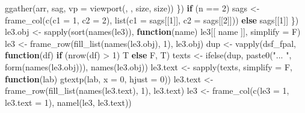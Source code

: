 \documentclass[
]{article}
\newenvironment{Shaded}{\begin{snugshade}}{\end{snugshade}}
\newcommand{\AttributeTok}[1]{\textcolor[rgb]{0.77,0.63,0.00}{#1}}
\newcommand{\ControlFlowTok}[1]{\textcolor[rgb]{0.13,0.29,0.53}{\textbf{#1}}}
\newcommand{\DecValTok}[1]{\textcolor[rgb]{0.00,0.00,0.81}{#1}}
\newcommand{\FunctionTok}[1]{\textcolor[rgb]{0.00,0.00,0.00}{#1}}
\newcommand{\NormalTok}[1]{#1}
\newcommand{\OtherTok}[1]{\textcolor[rgb]{0.56,0.35,0.01}{#1}}
\newcommand{\SpecialCharTok}[1]{\textcolor[rgb]{0.00,0.00,0.00}{#1}}
\newcommand{\StringTok}[1]{\textcolor[rgb]{0.31,0.60,0.02}{#1}}
\begin{document}
\begin{Shaded}
\begin{Highlighting}[]
        \FunctionTok{ggather}\NormalTok{(arr, sag, }\AttributeTok{vp =} \FunctionTok{viewport}\NormalTok{(, , size, size))}
\NormalTok{      \})}
    \ControlFlowTok{if}\NormalTok{ (n  }\SpecialCharTok{==} \DecValTok{2}\NormalTok{)}
\NormalTok{      sags }\OtherTok{\textless{}{-}} \FunctionTok{frame\_col}\NormalTok{(}\FunctionTok{c}\NormalTok{(}\AttributeTok{c1 =} \DecValTok{1}\NormalTok{, }\AttributeTok{c2 =} \DecValTok{2}\NormalTok{),}
        \FunctionTok{list}\NormalTok{(}\AttributeTok{c1 =}\NormalTok{ sags[[}\DecValTok{1}\NormalTok{]], }\AttributeTok{c2 =}\NormalTok{ sags[[}\DecValTok{2}\NormalTok{]]))}
    \ControlFlowTok{else}
\NormalTok{      sags[[}\DecValTok{1}\NormalTok{]]}
\NormalTok{  \})}
\NormalTok{le3.obj }\OtherTok{\textless{}{-}} \FunctionTok{sapply}\NormalTok{(}\FunctionTok{sort}\NormalTok{(}\FunctionTok{names}\NormalTok{(le3)), }\ControlFlowTok{function}\NormalTok{(name) le3[[ name ]], }\AttributeTok{simplify =}\NormalTok{ F)}
\NormalTok{le3 }\OtherTok{\textless{}{-}} \FunctionTok{frame\_row}\NormalTok{(}\FunctionTok{fill\_list}\NormalTok{(}\FunctionTok{names}\NormalTok{(le3.obj), }\DecValTok{1}\NormalTok{), le3.obj)}
\NormalTok{dup }\OtherTok{\textless{}{-}} \FunctionTok{vapply}\NormalTok{(dsf\_fpal, }\ControlFlowTok{function}\NormalTok{(df) }\ControlFlowTok{if}\NormalTok{ (}\FunctionTok{nrow}\NormalTok{(df) }\SpecialCharTok{\textgreater{}} \DecValTok{1}\NormalTok{) T }\ControlFlowTok{else}\NormalTok{ F, T)}
\NormalTok{texts }\OtherTok{\textless{}{-}} \FunctionTok{ifelse}\NormalTok{(dup, }\FunctionTok{paste0}\NormalTok{(}\StringTok{"...  "}\NormalTok{, }\FunctionTok{form}\NormalTok{(}\FunctionTok{names}\NormalTok{(le3.obj))), }\FunctionTok{names}\NormalTok{(le3.obj))}
\NormalTok{le3.text }\OtherTok{\textless{}{-}} \FunctionTok{sapply}\NormalTok{(texts, }\AttributeTok{simplify =}\NormalTok{ F,}
  \ControlFlowTok{function}\NormalTok{(lab) }\FunctionTok{gtextp}\NormalTok{(lab, }\AttributeTok{x =} \DecValTok{0}\NormalTok{, }\AttributeTok{hjust =} \DecValTok{0}\NormalTok{))}
\NormalTok{le3.text }\OtherTok{\textless{}{-}} \FunctionTok{frame\_row}\NormalTok{(}\FunctionTok{fill\_list}\NormalTok{(}\FunctionTok{names}\NormalTok{(le3.text), }\DecValTok{1}\NormalTok{), le3.text)}
\NormalTok{le3 }\OtherTok{\textless{}{-}} \FunctionTok{frame\_col}\NormalTok{(}\FunctionTok{c}\NormalTok{(}\AttributeTok{le3 =} \DecValTok{1}\NormalTok{, }\AttributeTok{le3.text =} \DecValTok{1}\NormalTok{), }\FunctionTok{namel}\NormalTok{(le3, le3.text))}


\end{Highlighting}
\end{Shaded}
\end{document}

